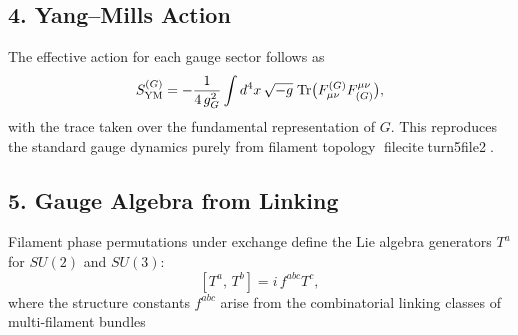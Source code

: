 \subsection*{4. Yang–Mills Action}
The effective action for each gauge sector follows as
\[
S_{\rm YM}^{(G)} 
= -\frac{1}{4\,g_G^2}\int d^4x\,\sqrt{-g}\;
\mathrm{Tr}\bigl(F_{\mu\nu}^{(G)}F^{\mu\nu}_{(G)}\bigr),
\]
with the trace taken over the fundamental representation of \(G\). This reproduces the standard gauge dynamics purely from filament topology fileciteturn5file2.

\subsection*{5. Gauge Algebra from Linking}
Filament phase permutations under exchange define the Lie algebra generators \(T^a\) for \(SU(2)\) and \(SU(3)\):
\[
[T^a,\,T^b] = i\,f^{abc}T^c,
\]
where the structure constants \(f^{abc}\) arise from the combinatorial linking classes of multi‑filament bundles 
